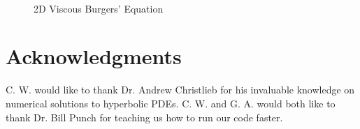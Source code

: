 \documentclass{article}
\begin{document}
\begin{figure}[p]
\centering
\captionsetup[subfigure]{labelformat=empty}
\\
\vfill
{}
\caption{2D Viscous Burgers' Equation} 
\label{2D_Viscous_Burgers_2048}
\end{figure}

\section{Acknowledgments}

C. W. would like to thank Dr. Andrew Christlieb for his invaluable knowledge on numerical solutions to hyperbolic PDEs. C. W. and G. A. would both like to thank Dr. Bill Punch for teaching us how to run our code faster.







  

\end{document}
